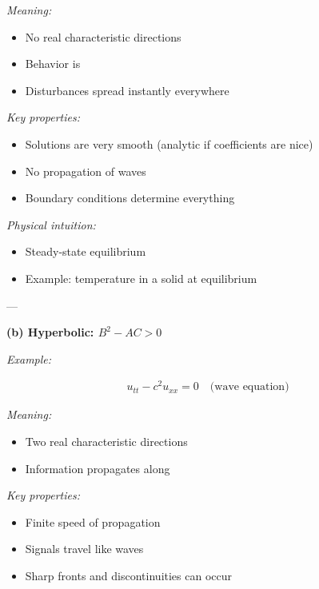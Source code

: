 \documentclass[12pt,a4paper]{report}
\begin{document}
\begin{description}
\begin{description}
\begin{description}
\begin{description}
\item \textit{Meaning:}

\begin{itemize}
\item No real characteristic directions
\item Behavior is 
\item Disturbances spread instantly everywhere
\end{itemize}

\item \textit{Key properties:}

\begin{itemize}
\item Solutions are very smooth (analytic if coefficients are nice)
\item No propagation of waves
\item Boundary conditions determine everything
\end{itemize}

\item \textit{Physical intuition:}

\begin{itemize}
\item Steady-state equilibrium
\item Example: temperature in a solid at equilibrium
\end{itemize}

---
\end{description}

\item \textbf{(b) Hyperbolic: $B^2 - AC > 0$}
\begin{description}
\item \textit{Example:}

\begin{align*}
u_{tt} - c^2 u_{xx} = 0 \quad \text{(wave equation)}
\end{align*}

\item \textit{Meaning:}

\begin{itemize}
\item Two real characteristic directions
\item Information propagates along 
\end{itemize}

\item \textit{Key properties:}

\begin{itemize}
\item Finite speed of propagation
\item Signals travel like waves
\item Sharp fronts and discontinuities can occur
\end{itemize}


\end{description}
\end{description}
\end{description}
\end{description}
\end{document}
